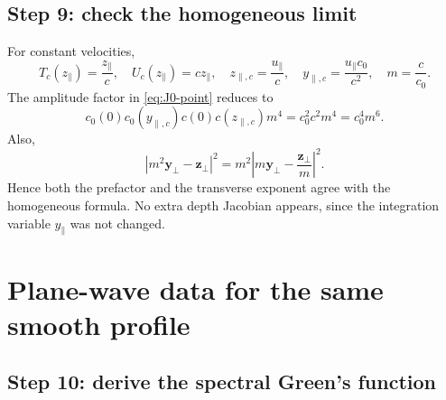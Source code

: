 \documentclass[11pt]{article}
\newcommand{\by}{\bm{y}}
\newcommand{\bz}{\bm{z}}
\begin{document}
\subsection{Step 9: check the homogeneous limit}

For constant velocities,
\begin{equation}
T_c(z_\parallel)=\frac{z_\parallel}{c},\quad
U_c(z_\parallel)=cz_\parallel,\quad
z_{\parallel,c}=\frac{u_\parallel}{c},\quad
y_{\parallel,c}=\frac{u_\parallel c_0}{c^2},\quad
m=\frac{c}{c_0}.
\end{equation}
The amplitude factor in \eqref{eq:J0-point} reduces to
\begin{equation}
c_0(0)c_0(y_{\parallel,c})c(0)c(z_{\parallel,c})m^4
=c_0^2c^2m^4=c_0^4m^6.
\end{equation}
Also,
\begin{equation}
|m^2\by_\perp-\bz_\perp|^2
=m^2\left|m\by_\perp-\frac{\bz_\perp}{m}\right|^2.
\end{equation}
Hence both the prefactor and the transverse exponent agree with the
homogeneous formula. No extra depth Jacobian appears, since the
integration variable $y_\parallel$ was not changed.

\section{Plane-wave data for the same smooth profile}

\subsection{Step 10: derive the spectral Green's function}
\end{document}
